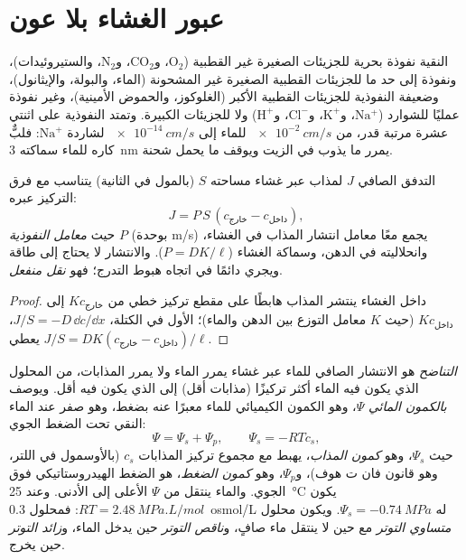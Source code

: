 \section{عبور الغشاء بلا عون}

\begin{proposition}\label{prop:b1:membranes-transport:permeability}
 النقية نفوذة بحرية للجزيئات الصغيرة غير
القطبية ($\mathrm{O_2}$، و$\mathrm{CO_2}$، و$\mathrm{N_2}$،
والستيروئيدات)، ونفوذة إلى حد ما للجزيئات القطبية الصغيرة غير
المشحونة (الماء، والبولة، والإيثانول)، وضعيفة النفوذية للجزيئات
القطبية الأكبر (الغلوكوز، والحموض الأمينية)، وغير نفوذة عمليًا
للشوارد ($\mathrm{Na^+}$، و$\mathrm{K^+}$، و$\mathrm{Cl^-}$،
و$\mathrm{H^+}$) ولا للجزيئات الكبيرة. وتمتد النفوذية على اثنتي عشرة
مرتبة قدر، من $\qty{e-2}{cm/s}$ للماء إلى $\qty{e-14}{cm/s}$
لشاردة $\mathrm{Na^+}$: فلبٌّ كاره للماء سماكته \qty{3}{nm} يمرر ما يذوب
في الزيت ويوقف ما يحمل شحنة.
\end{proposition}

\begin{theorem}\label{thm:b1:membranes-transport:fick}
التدفق الصافي $J$ لمذاب عبر غشاء مساحته $S$ (بالمول في الثانية)
يتناسب مع فرق التركيز عبره:
\[
J = P\,S\,(c_{\text{خارج}} - c_{\text{داخل}}),
\]
حيث \emph{معامل النفوذية} $P$ (بوحدة \unit{m/s}) يجمع معًا معامل
انتشار المذاب في الغشاء، وانحلاليته في الدهن، وسماكة الغشاء
($P = DK/\ell$). والانتشار لا يحتاج إلى طاقة ويجري دائمًا في اتجاه
هبوط التدرج؛ فهو \emph{نقل منفعل}.
\end{theorem}
\begin{proof}
داخل الغشاء ينتشر المذاب هابطًا على مقطع تركيز خطي من
$Kc_{\text{خارج}}$ إلى $Kc_{\text{داخل}}$ (حيث $K$ معامل التوزع بين
الدهن والماء)؛  الأول في الكتلة،
$J/S = -D\,\dd c/\dd x$، يعطي
$J/S = DK(c_{\text{خارج}} -
c_{\text{داخل}})/\ell$.
\end{proof}

\begin{definition}\label{def:b1:membranes-transport:osmosis}
\emph{التناضح} هو الانتشار الصافي للماء عبر غشاء يمرر
الماء ولا يمرر المذابات، من المحلول الذي يكون فيه الماء أكثر تركيزًا
(مذابات أقل) إلى الذي يكون فيه أقل. ويوصف \emph{بالكمون
المائي} $\Psi$، وهو الكمون الكيميائي للماء معبرًا
عنه بضغط، وهو صفر عند الماء النقي تحت الضغط الجوي:
\[
\Psi = \Psi_s + \Psi_p, \qquad \Psi_s = -RTc_s ,
\]
حيث $\Psi_s$، وهو \emph{كمون المذاب}، يهبط مع
مجموع تركيز المذابات $c_s$ (بالأوسمول في اللتر، وهو قانون فان
ت هوف)، و$\Psi_p$، وهو \emph{كمون الضغط}، هو الضغط
الهيدروستاتيكي فوق الجوي. والماء ينتقل من $\Psi$ الأعلى إلى الأدنى.
وعند \qty{25}{\celsius} يكون $RT = \qty{2.48}{MPa.L/mol}$: فمحلول
\qty{0.3}{osmol/L} له $\Psi_s = \qty{-0.74}{MPa}$. ويكون محلول
\emph{متساوي التوتر} مع  حين لا ينتقل ماء
صافٍ، و\emph{ناقص التوتر} حين يدخل الماء، و\emph{زائد التوتر} حين
يخرج.
\end{definition}

